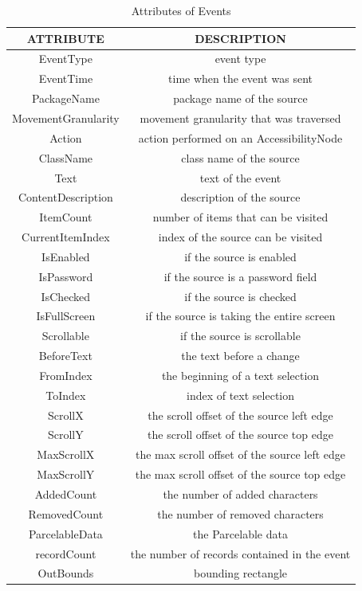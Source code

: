 \documentclass[10pt,conference]{IEEEtran}
\begin{document}
\begin{table}[!htbp]
\centering
\tiny
\caption{Attributes of Events}
\begin{tabular}{c|c} \hline
ATTRIBUTE &DESCRIPTION\\ \hline
EventType & event type\\ \hline
EventTime & time when the event was sent\\ \hline
PackageName & package name of the source\\ \hline
MovementGranularity & movement granularity that was traversed\\ \hline
Action & action performed on an AccessibilityNode\\ \hline
ClassName & class name of the source\\ \hline
Text & text of the event\\ \hline
ContentDescription & description of the source\\ \hline
ItemCount & number of items that can be visited\\ \hline
CurrentItemIndex & index of the source can be visited\\ \hline
IsEnabled & if the source is enabled\\ \hline
IsPassword & if the source is a password field\\ \hline
IsChecked & if the source is checked\\ \hline
IsFullScreen & if the source is taking the entire screen\\ \hline
Scrollable & if the source is scrollable\\ \hline
BeforeText & the text before a change\\ \hline
FromIndex & the beginning of a text selection \\ \hline
ToIndex &  index of text selection \\ \hline
ScrollX &   the scroll offset of the source left edge \\ \hline
ScrollY &   the scroll offset of the source top edge \\ \hline
MaxScrollX &  the max scroll offset of the source left edge\\ \hline
MaxScrollY &  the max scroll offset of the source top edge\\ \hline
AddedCount &  the number of added characters \\ \hline
RemovedCount &  the number of removed characters \\ \hline
ParcelableData &  the Parcelable data\\ \hline
recordCount &  the number of records contained in the event \\ \hline
OutBounds & bounding rectangle\\ \hline
\end{tabular}
\label{tab:eventSequence}
\end{table}
\end{document}
